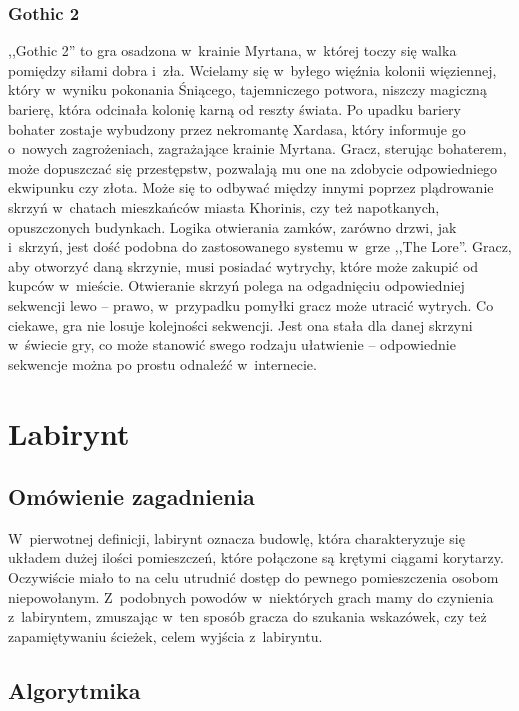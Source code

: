 \documentclass[oneside,polski,logo]{amuthesis}
\begin{document}
\subsubsection{Gothic 2}
\par ,,Gothic 2'' to gra osadzona w~krainie Myrtana, w~której toczy się walka pomiędzy siłami dobra i~zła. Wcielamy się w~byłego więźnia kolonii więziennej, który w~wyniku pokonania Śniącego, tajemniczego potwora, niszczy magiczną barierę, która odcinała kolonię karną od reszty świata. Po upadku bariery bohater zostaje wybudzony przez nekromantę Xardasa, który informuje go o~nowych zagrożeniach, zagrażające krainie Myrtana. Gracz, sterując bohaterem, może dopuszczać się przestępstw, pozwalają mu one na zdobycie odpowiedniego ekwipunku czy złota. Może się to odbywać między innymi poprzez plądrowanie skrzyń w~chatach mieszkańców miasta Khorinis, czy też napotkanych, opuszczonych budynkach. 
Logika otwierania zamków, zarówno drzwi, jak i~skrzyń, jest dość podobna do zastosowanego systemu w~grze ,,The Lore''. Gracz, aby otworzyć daną skrzynie, musi posiadać wytrychy, które może zakupić od kupców w~mieście. Otwieranie skrzyń polega na odgadnięciu odpowiedniej sekwencji lewo – prawo, w~przypadku pomyłki gracz może utracić wytrych. Co ciekawe, gra nie losuje kolejności sekwencji. Jest ona stała dla danej skrzyni w~świecie gry, co może stanowić swego rodzaju ułatwienie – odpowiednie sekwencje można po prostu odnaleźć w~internecie.


\section{Labirynt}
\subsection{Omówienie zagadnienia}
\par W~pierwotnej definicji, labirynt oznacza budowlę, która charakteryzuje się układem dużej ilości pomieszczeń, które połączone są krętymi ciągami korytarzy. Oczywiście miało to na celu utrudnić dostęp do pewnego pomieszczenia osobom niepowołanym. Z~podobnych powodów w~niektórych grach mamy do czynienia z~labiryntem, zmuszając w~ten sposób gracza do szukania wskazówek, czy też zapamiętywaniu ścieżek, celem wyjścia z~labiryntu. 
\subsection{Algorytmika}
\end{document}
